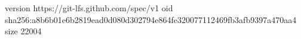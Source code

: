 version https://git-lfs.github.com/spec/v1
oid sha256:a8b6b01e6b2819ead0d080d302794e864fe320077112469fb3afb9397a470aa4
size 22004
